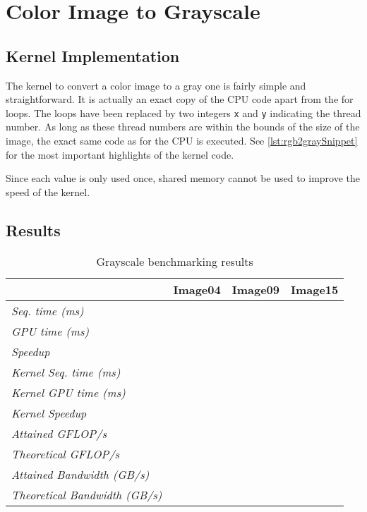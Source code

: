 \documentclass[final]{report}
\begin{document}
\chapter{Color Image to Grayscale}

\section{Kernel Implementation}\label{sec:rgb2gray}
The kernel to convert a color image to a gray one is fairly simple and straightforward.
It is actually an exact copy of the CPU code apart from the for loops.
The loops have been replaced by two integers \texttt{x} and \texttt{y} indicating the thread number.
As long as these thread numbers are within the bounds of the size of the image, the exact same code as for the CPU is executed.
See \cref{lst:rgb2graySnippet} for the most important highlights of the kernel code.


Since each value is only used once, shared memory cannot be used to improve the speed of the kernel.


\section{Results}
\begin{table}[H]
	\centering
	\caption{Grayscale benchmarking results}
	\label{tab:rgb2grayscale-results}
	\begin{tabular}{llll}
	\toprule
											& \textbf{Image04} 	& \textbf{Image09} & \textbf{Image15} \\
	\midrule
	\textit{Seq. time (ms)} 				& ~ 				& ~ 				& ~ \\
	\textit{GPU time (ms)} 					& ~ 				& ~ 				& ~ \\
	\textit{Speedup} 						& ~ 				& ~ 				& ~ \\
	\midrule
	\textit{Kernel Seq. time (ms)} 			& ~ 				& ~ 				& ~ \\
	\textit{Kernel GPU time (ms)} 			& ~ 				& ~ 				& ~ \\
	\textit{Kernel Speedup} 				& ~ 				& ~ 				& ~ \\
	\midrule
	\textit{Attained GFLOP/s} 				& ~ 				& ~ 				& ~ \\
	\textit{Theoretical GFLOP/s} 			& ~ 				& ~ 				& ~ \\
	\textit{Attained Bandwidth (GB/s)}		& ~ 				& ~ 				& ~ \\
	\textit{Theoretical Bandwidth (GB/s)}	& ~ 				& ~ 				& ~ \\
	\bottomrule
	\end{tabular}
\end{table}
\end{document}
